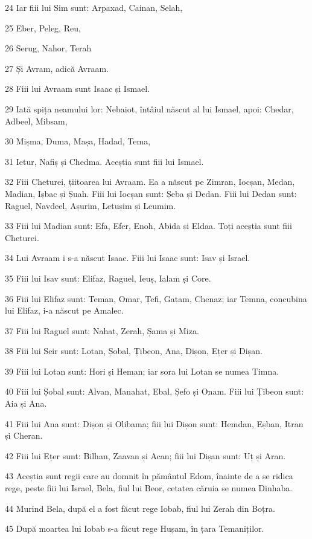 \par 24 Iar fiii lui Sim sunt: Arpaxad, Cainan, Selah,
\par 25 Eber, Peleg, Reu,
\par 26 Serug, Nahor, Terah
\par 27 Și Avram, adică Avraam.
\par 28 Fiii lui Avraam sunt Isaac și Ismael.
\par 29 Iată spița neamului lor: Nebaiot, întâiul născut al lui Ismael, apoi: Chedar, Adbeel, Mibsam,
\par 30 Mișma, Duma, Mașa, Hadad, Tema,
\par 31 Ietur, Nafiș și Chedma. Aceștia sunt fiii lui Ismael.
\par 32 Fiii Cheturei, țiitoarea lui Avraam. Ea a născut pe Zimran, Iocșan, Medan, Madian, Ișbac și Șuah. Fiii lui Iocșan sunt: Șeba și Dedan. Fiii lui Dedan sunt: Raguel, Navdeel, Așurim, Letușim și Leumim.
\par 33 Fiii lui Madian sunt: Efa, Efer, Enoh, Abida și Eldaa. Toți aceștia sunt fiii Cheturei.
\par 34 Lui Avraam i s-a născut Isaac. Fiii lui Isaac sunt: Isav și Israel.
\par 35 Fiii lui Isav sunt: Elifaz, Raguel, Ieuș, Ialam și Core.
\par 36 Fiii lui Elifaz sunt: Teman, Omar, Țefi, Gatam, Chenaz; iar Temna, concubina lui Elifaz, i-a născut pe Amalec.
\par 37 Fiii lui Raguel sunt: Nahat, Zerah, Șama și Miza.
\par 38 Fiii lui Seir sunt: Lotan, Șobal, Țibeon, Ana, Dișon, Ețer și Dișan.
\par 39 Fiii lui Lotan sunt: Hori și Heman; iar sora lui Lotan se numea Timna.
\par 40 Fiii lui Șobal sunt: Alvan, Manahat, Ebal, Șefo și Onam. Fiii lui Țibeon sunt: Aia și Ana.
\par 41 Fiii lui Ana sunt: Dișon și Olibama; fiii lui Dișon sunt: Hemdan, Eșban, Itran și Cheran.
\par 42 Fiii lui Ețer sunt: Bilhan, Zaavan și Acan; fiii lui Dișan sunt: Uț și Aran.
\par 43 Aceștia sunt regii care au domnit în pământul Edom, înainte de a se ridica rege, peste fiii lui Israel, Bela, fiul lui Beor, cetatea căruia se numea Dinhaba.
\par 44 Murind Bela, după el a fost făcut rege Iobab, fiul lui Zerah din Boțra.
\par 45 După moartea lui Iobab s-a făcut rege Hușam, în țara Temaniților.
